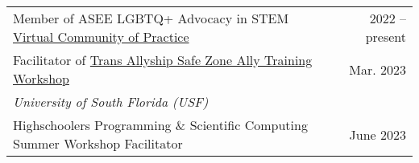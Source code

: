 \documentclass[letterpaper,11pt]{article}
\begin{document}
\begin{longtable}{@{}p{}r@{}}
  \hspace{7mm} Member of ASEE LGBTQ+ Advocacy in STEM \href{https://lgbtq.asee.org/our-community/}{Virtual Community of Practice}                                                                                 & 2022 -- present                                                             \\ [3pt]
  \hspace{7mm} Facilitator of \href{https://lgbtq.asee.org/ally-training/online-workshops/#:~:text=Safe\%20Zone\%20Ally\%20Training\%3A\%20Tans\%20Allyship}{Trans Allyship Safe Zone Ally Training Workshop}     & Mar. 2023                                                                   \\ [4pt]
  \multicolumn{2}{l}{\hspace{1mm} \textit{University of South Florida (USF)}}                                                                                                                                                                                                                   \\ [3pt]
  \hspace{7mm} Highschoolers Programming \& Scientific Computing Summer Workshop Facilitator                                                                                                                      & June 2023                                                                   \\ [4pt]

\end{longtable}
\end{document}
